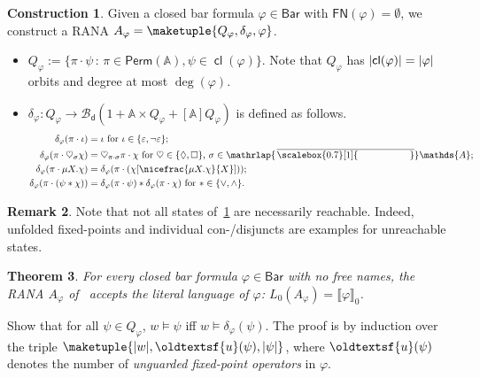 \documentclass[10pt,a4paper]{amsart}
\newtheorem{theo}{Theorem}[section]
\theoremstyle{definition}
\newtheorem{rem}[theo]{Remark}
\newtheorem{construction}[theo]{Construction}
\renewcommand{\textsf}[1]{{\oldtextsf{\small#1}}}
\newcommand{\At}{\mathds{A}}
\newcommand{\sem}[1]{\llbracket #1 \rrbracket}
\newcommand{\op}[1]{\operatorname{\mathsf{#1}}}
\newcommand{\cl}{\op{cl}}
\newcommand{\card}[1]{\left\vert#1\right\vert}
\newcommand{\allbool}{\mathcal{B}}
\newcommand{\dualbool}{\allbool_\mathsf{d}}
\newcommand{\Perm}{\mathsf{Perm}}
\newcommand{\names}{\At}
\newcommand{\Abstr}[2][\names]{[#1]#2}
\newcommand{\set}[1]{\{#1\}}
\newcommand{\setw}[2]{\{#1\,:\,#2\}}
\newcommand{\mybar}[3]{%
  \mathrlap{\hspace{#2}\overline{\scalebox{#1}[1]{\phantom{\ensuremath{#3}}}}}\ensuremath{#3}
}
\newcommand{\FN}{\mathsf{FN}}
\newcommand{\BarForm}{\mathsf{Bar}}
\newcommand{\barNames}{{\mybar{0.7}{1.25pt}{\names}}}
\renewcommand{\vDash}{\models}
\let\originalleft\left
\let\originalright\right
\renewcommand{\left}{\mathopen{}\mathclose\bgroup\originalleft}
\renewcommand{\right}{\aftergroup\egroup\originalright}
\begin{document}
\begin{construction}\label{constr:formaut}
  Given a closed bar formula $\varphi \in \BarForm$ with $\FN(\varphi) = \emptyset$, we
  construct a RANA $A_\varphi = \maketuple{Q_\varphi,\delta_\varphi,\varphi}$.
  \begin{itemize}
    \item $Q_\varphi := \setw{\pi \cdot \psi}{\pi \in \Perm(\names), \psi \in \cl(\varphi)}$. Note that
      $Q_\varphi$ has $\card{\cl(\varphi)} = \card{\varphi}$ orbits and  degree at most
      $\deg(\varphi)$.
    \item $\delta_\varphi\colon Q_\varphi \to \dualbool(1 + \names \times Q_\varphi + \Abstr{Q_\varphi})$
      is defined as follows.
      \begin{align*}
        \delta_\varphi(\pi \cdot \iota)
        &= \iota\ \text{for $\iota \in \set{\varepsilon, \neg\varepsilon}$}; \\
        \delta_\varphi(\pi \cdot \heartsuit_\sigma \chi)
        &= \heartsuit_{\pi\cdot\sigma} \pi \cdot \chi\
        \text{for $\heartsuit \in \set{\Diamond, \Box}$, $\sigma \in \barNames$}; \\
        \delta_\varphi(\pi \cdot \mu X.\chi)
        &= \delta_\varphi(\pi \cdot (\chi[\nicefrac{\mu X.\chi}{X}])); \\
        \delta_\varphi(\pi \cdot (\psi \ast \chi))
        &= \delta_\varphi(\pi \cdot \psi) \ast \delta_\varphi(\pi \cdot \chi)\ \text{for $\ast \in \set{\vee, \wedge}$}.
    \end{align*}
  \end{itemize}
\end{construction}

\begin{rem}\label{rem:formautconstr}
  Note that not all states of~\cref{constr:formaut} are necessarily reachable. Indeed, unfolded fixed-points and
  individual con-/disjuncts are examples for unreachable states.
\end{rem}

\begin{theo}\label{theo:corrFormAut}
  For every closed bar formula $\varphi \in \BarForm$ with no free names, the RANA $A_\varphi$ of~
  accepts the literal language of $\varphi$: $L_0(A_\varphi) = \sem{\varphi}_0$.
\end{theo}
\begin{IEEEproof}
  Show that for all $\psi \in Q_\varphi$,
  $w \vDash \psi$ iff $w \vDash \delta_\varphi(\psi)$. The proof
  is by induction over the triple $\maketuple{\card{w}, \textsf{u}(\psi),
  \card{\psi}}$, where $\textsf{u}(\psi)$ denotes the number of \emph{unguarded fixed-point operators} in
  $\varphi$.
\end{IEEEproof}
\end{document}
